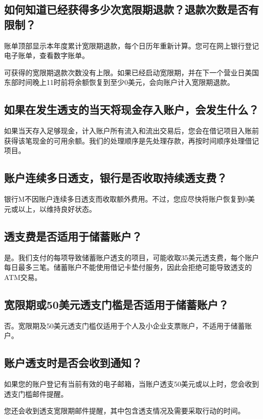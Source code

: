 \documentclass[UTF8,fontset=none,11pt,a4paper]{ctexart}
\begin{document}
\subsection*{如何知道已经获得多少次宽限期退款？退款次数是否有限制？}
账单顶部显示本年度累计宽限期退款，每个日历年重新计算。您可在网上银行登记电子账单，查看\allowbreak\mbox{数字账单。}


可获得的宽限期退款次数没有上限。如果已经启动宽限期，并在下一个营业日美国东部时间晚上11时前将余额恢复到至少0美元，会向账户计入宽\allowbreak\mbox{限期退款。}


\subsection*{如果在发生透支的当天将现金存入账户，会发生什么？}
如果当天存入足够现金，计入账户所有流入和流出交易后，您会在借记项目入账前获得该笔现金的可用余额。我们的处理顺序是先处理存款，再按时间顺序处理\allowbreak\mbox{借记项目。}


\subsection*{账户连续多日透支，银行是否收取持续透支费？}
银行M不因账户连续多日透支而收取额外费用。不过，您应尽快将账户恢复到0美元或以上，以维持\allowbreak\mbox{良好状态。}


\subsection*{透支费是否适用于储蓄账户？}
是。我们支付的每项导致储蓄账户透支的项目，可能收取35美元透支费，每个账户每日最多三笔。储蓄账户不能使用借记卡垫付服务，因此会拒绝可能导致透支的ATM交易。


\subsection*{宽限期或50美元透支门槛是否适用于储蓄账户？}
否。宽限期及50美元透支门槛仅适用于个人及小企业支票账户，不适用于\allowbreak\mbox{储蓄账户。}


\subsection*{账户透支时是否会收到通知？}
如果您的账户登记有当前有效的电子邮箱，当账户透支50美元或以上时，您会收到透支门槛\allowbreak\mbox{邮件提醒。}


您还会收到透支宽限期邮件提醒，其中包含透支情况及需要采取行\allowbreak\mbox{动的时间。}
\end{document}
